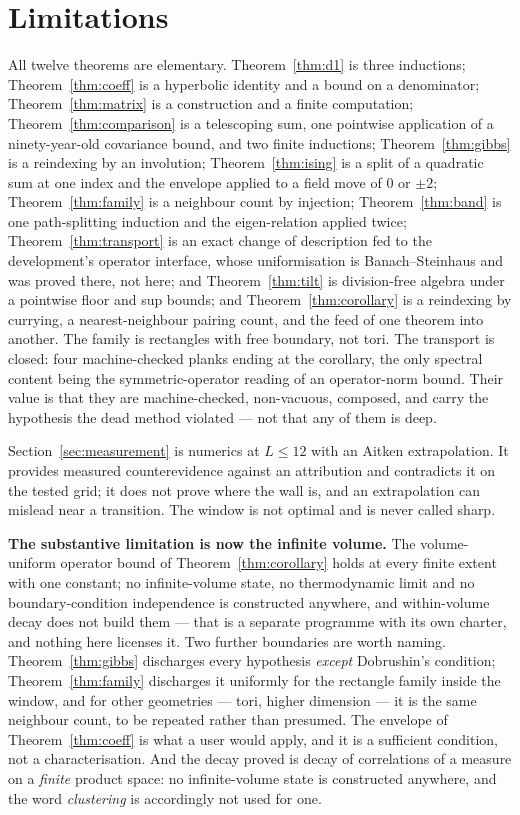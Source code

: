 \documentclass[11pt]{article}
\theoremstyle{definition}
\begin{document}
\section{Limitations}

All twelve theorems are elementary.  Theorem~\ref{thm:d1} is three inductions;
Theorem~\ref{thm:coeff} is a hyperbolic identity and a bound on a denominator;
Theorem~\ref{thm:matrix} is a construction and a finite computation;
Theorem~\ref{thm:comparison} is a telescoping sum, one pointwise application of
a ninety-year-old covariance bound, and two finite inductions;
Theorem~\ref{thm:gibbs} is a reindexing by an involution;
Theorem~\ref{thm:ising} is a split of a quadratic sum at one index and the
envelope applied to a field move of $0$ or $\pm2$;
Theorem~\ref{thm:family} is a neighbour count by injection;
Theorem~\ref{thm:band} is one path-splitting induction and the eigen-relation
applied twice; Theorem~\ref{thm:transport} is an exact change of description
fed to the development's operator interface, whose uniformisation is
Banach--Steinhaus and was proved there, not here; and
Theorem~\ref{thm:tilt} is division-free algebra under a pointwise floor and
sup bounds; and Theorem~\ref{thm:corollary} is a reindexing by currying,
a nearest-neighbour pairing count, and the feed of one theorem into
another.  The family is
rectangles with free boundary, not tori.  The transport is closed: four
machine-checked planks ending at the corollary, the only spectral
content being the symmetric-operator reading of an operator-norm bound.
Their value
is that they are machine-checked, non-vacuous, composed, and carry the hypothesis
the dead method violated --- not that any of them is deep.

Section~\ref{sec:measurement} is numerics at $L\le12$ with an Aitken
extrapolation.  It provides measured counterevidence against an attribution and
contradicts it on the tested grid; it does not prove where the wall is,
and an extrapolation can mislead near a transition.  The window is not optimal
and is never called sharp.

\textbf{The substantive limitation is now the infinite volume.}  The
volume-uniform operator bound of Theorem~\ref{thm:corollary} holds at
every finite extent with one constant; no infinite-volume state, no
thermodynamic limit and no boundary-condition independence is
constructed anywhere, and within-volume decay does not build them ---
that is a separate programme with its own charter, and nothing here
licenses it.
Two further boundaries are worth naming.  Theorem~\ref{thm:gibbs} discharges
every hypothesis \emph{except} Dobrushin's condition;
Theorem~\ref{thm:family} discharges it uniformly for the rectangle family
inside the window, and for other geometries --- tori, higher dimension ---
it is the same neighbour count, to be repeated rather than presumed.
The envelope of Theorem~\ref{thm:coeff} is what a user
would apply, and it is a sufficient condition, not a characterisation.  And the
decay proved is decay of correlations of a measure on a \emph{finite} product
space: no infinite-volume state is constructed anywhere, and the word
\emph{clustering} is accordingly not used for one.
\end{document}
